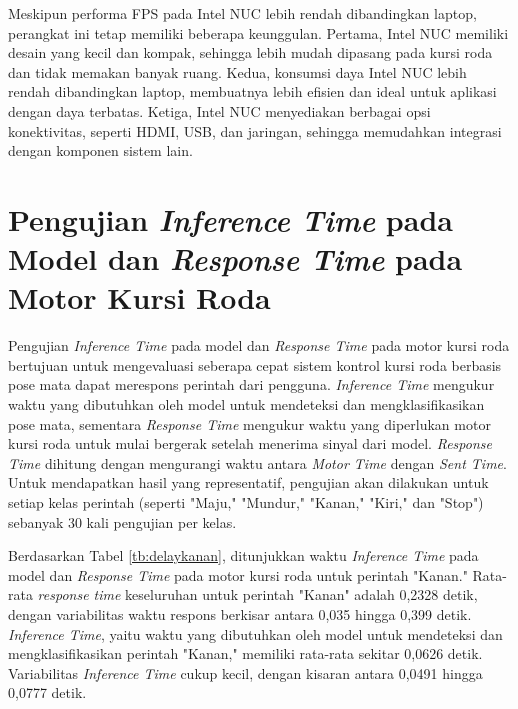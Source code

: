 Meskipun performa FPS pada Intel NUC lebih rendah dibandingkan laptop, perangkat ini tetap memiliki beberapa keunggulan. Pertama, Intel NUC memiliki desain yang kecil dan kompak, sehingga lebih mudah dipasang pada kursi roda dan tidak memakan banyak ruang. Kedua, konsumsi daya Intel NUC lebih rendah dibandingkan laptop, membuatnya lebih efisien dan ideal untuk aplikasi dengan daya terbatas. Ketiga, Intel NUC menyediakan berbagai opsi konektivitas, seperti HDMI, USB, dan jaringan, sehingga memudahkan integrasi dengan komponen sistem lain. 

\section{Pengujian \emph{Inference Time} pada Model dan \emph{Response Time} pada Motor Kursi Roda}

Pengujian \emph{Inference Time} pada model dan \emph{Response Time} pada motor kursi roda bertujuan untuk mengevaluasi seberapa cepat sistem kontrol kursi roda berbasis pose mata dapat merespons perintah dari pengguna. \emph{Inference Time} mengukur waktu yang dibutuhkan oleh model untuk mendeteksi dan mengklasifikasikan pose mata, sementara \emph{Response Time} mengukur waktu yang diperlukan motor kursi roda untuk mulai bergerak setelah menerima sinyal dari model. \emph{Response Time} dihitung dengan mengurangi waktu antara \emph{Motor Time} dengan \emph{Sent Time}. Untuk mendapatkan hasil yang representatif, pengujian akan dilakukan untuk setiap kelas perintah (seperti "Maju," "Mundur," "Kanan," "Kiri," dan "Stop") sebanyak 30 kali pengujian per kelas.

Berdasarkan Tabel \ref{tb:delaykanan}, ditunjukkan waktu \emph{Inference Time} pada model dan \emph{Response Time} pada motor kursi roda untuk perintah "Kanan." Rata-rata \emph{response time} keseluruhan untuk perintah "Kanan" adalah 0,2328 detik, dengan variabilitas waktu respons berkisar antara 0,035 hingga 0,399 detik. \emph{Inference Time}, yaitu waktu yang dibutuhkan oleh model untuk mendeteksi dan mengklasifikasikan perintah "Kanan," memiliki rata-rata sekitar 0,0626 detik. Variabilitas \emph{Inference Time} cukup kecil, dengan kisaran antara 0,0491 hingga 0,0777 detik.


